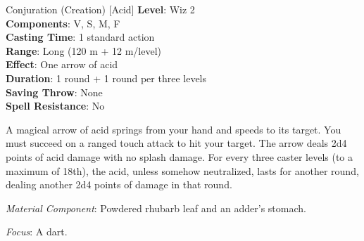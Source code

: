 {Conjuration (Creation) [Acid]}
{
	\textbf{Level}: Wiz 2\\
	\textbf{Components}: V, S, M, F\\
	\textbf{Casting Time}: 1 standard action\\
	\textbf{Range}: Long (120 m + 12 m/level)\\
	\textbf{Effect}: One arrow of acid\\
	\textbf{Duration}: 1 round + 1 round per three levels\\
	\textbf{Saving Throw}: None\\
	\textbf{Spell Resistance}: No\\
}
{
	A magical arrow of acid springs from your hand and speeds to its target. You must succeed on a ranged touch attack to hit your target. The arrow deals 2d4 points of acid damage with no splash damage. For every three caster levels (to a maximum of 18th), the acid, unless somehow neutralized, lasts for another round, dealing another 2d4 points of damage in that round.

	\textit{Material Component}: Powdered rhubarb leaf and an adder’s stomach.

	\textit{Focus}: A dart.
}